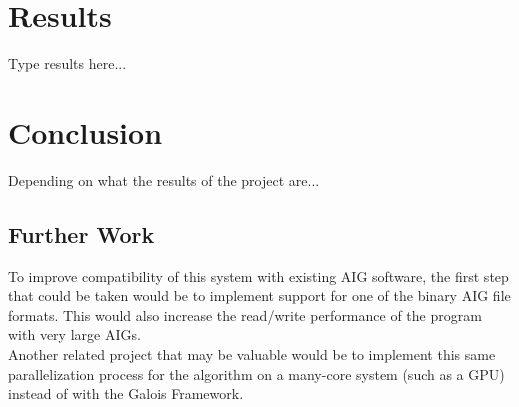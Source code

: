 \documentclass[twocolumn]{article}
\begin{document}
\section{Results}
Type results here...
\section{Conclusion}
Depending on what the results of the project are...
\subsection{Further Work}
To improve compatibility of this system with existing AIG software, the first step that could be taken would be to implement support for one of the binary AIG file formats. This would also increase the read/write performance of the program with very large AIGs.\\\indent
Another related project that may be valuable would be to implement this same parallelization process for the algorithm on a many-core system (such as a GPU) instead of with the Galois Framework.


\end{document}
